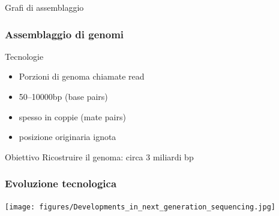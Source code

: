 \begin{frame}
      \titlepage

        \centering
          Grafi di assemblaggio
\end{frame}


\begin{frame}[fragile]
\frametitle{Assemblaggio di genomi}
\begin{block}{Tecnologie}
\begin{itemize}
\item
Porzioni di genoma chiamate \alert{read}
\item
50--10000bp (base pairs)
\item
spesso in coppie (\alert{mate pairs})
\item
posizione originaria ignota
\end{itemize}
\end{block}

\begin{block}{Obiettivo}
Ricostruire il genoma: circa 3 miliardi bp
\end{block}
\end{frame}

\begin{frame}[fragile]
\frametitle{Evoluzione tecnologica}
\texttt{[image: figures/Developments\_in\_next\_generation\_sequencing.jpg]}
\end{frame}

